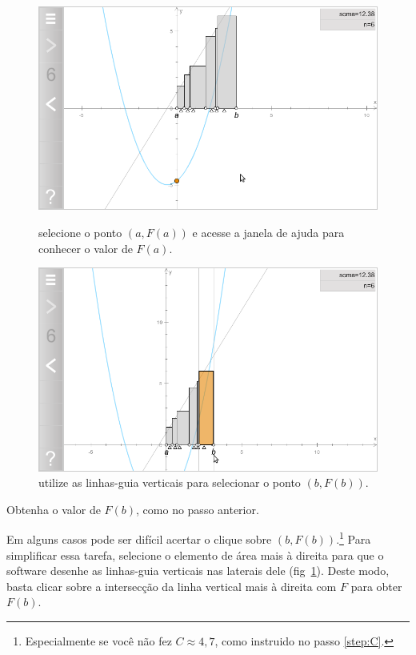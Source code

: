 \documentclass[a4paper,12pt]{scrartcl}
\begin{document}
\begin{list}{.}
      \begin{figure}
	\begin{minipage}[t]{0.49\textwidth}
	  \includegraphics[width=\textwidth]{F(a).png}	  
	  \caption{selecione o ponto $\left(a,F(a)\right)$ e acesse a janela de ajuda para conhecer o valor de $F(a)$.}
	  \label{fig:F(a)}
	\end{minipage}
	\hfill
	\begin{minipage}[t]{0.49\textwidth}
	  \includegraphics[width=\textwidth]{linhas-guia.png}
	  \caption{utilize as linhas-guia verticais para selecionar o ponto $\left(b,F(b)\right)$.}
	  \label{fig:linhas-guia}
	\end{minipage}	
      \end{figure}
      
      \item Obtenha o valor de $F(b)$, como no passo anterior.
      
      Em alguns casos pode ser difícil acertar o clique sobre $\left(b,F(b)\right)$.\footnote{Especialmente se você não fez $C \approx 4,7$, como instruido no passo \ref{step:C}.} Para simplificar essa tarefa, selecione o elemento de área mais à direita para que o software desenhe as linhas-guia verticais nas laterais dele (fig~\ref{fig:linhas-guia}). Deste modo, basta clicar sobre a intersecção da linha vertical mais à direita com $F$ para obter $F(b)$.
      

\end{list}
\end{document}
